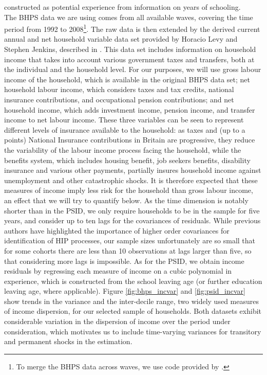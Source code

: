 constructed as potential experience from information on years of schooling. 
 \\
The BHPS data we are using comes from all available waves, covering the time 
period from 1992 to 2008\footnote{To merge the BHPS data across waves, we use 
code provided by \citet{Vandendriessche2015}.}. The raw data is then extended by
the derived current annual and net household variable data set provided by 
Horacio Levy and Stephen Jenkins, described in \citet{Jenkins2010}. This data set 
includes information on household income 
that takes into account various government taxes and transfers, both at the 
individual and the household level. For our purposes, we will use gross labour
income of the household, which is available in the original BHPS data set;
net household labour income, which considers taxes and tax credits, national
insurance contributions, and occupational pension contributions; and net 
household income, which adds investment income, pension income, and transfer
income to net labour income. These three variables can be seen to represent 
different levels of insurance available to the household: as taxes and (up to 
a points) National Insurance contributions in Britain are progressive, they reduce
the variability of the labour income process facing the household, while the
benefits system, which includes housing benefit, job seekers benefits, disability
insurance and various other payments, partially insures household income against
unemployment and other catastrophic shocks. It is therefore expected that these
measures of income imply less risk for the household than gross labour income,
an effect that we will try to quantify below. As the time dimension is notably 
shorter than in the PSID, we only require households to be in the sample 
for five years, and consider up to ten lags for the covariances of residuals. 
While previous authors have highlighted the importance of higher order covariances
for identification of HIP processes, our sample sizes unfortunately are so small
that for some cohorts there are less than 10 observations at lags larger than
five, so that considering more lags is impossible. As for the PSID, we obtain
income residuals by regressing each measure of income on a cubic polynomial 
in experience, which is constructed from the school leaving age (or further
education leaving age, where applicable). Figure \ref{fig:bhps_incvar} and
\ref{fig:psid_incvar} show trends in the variance and the inter-decile range,
two widely used measures of income dispersion, for our selected sample of households.
Both datasets exhibit considerable variation in the dispersion of income over 
the period under consideration, which motivates us to include time-varying
variances for transitory and permanent shocks in the estimation.

